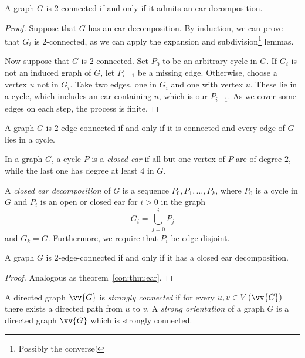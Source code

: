 \begin{izrek}
\label{con:thm:ear}
A graph $G$ is $2$-connected if and only if it admits an ear
decomposition.
\end{izrek}

\begin{proof}
Suppose that $G$ has an ear decomposition. By induction, we can
prove that $G_i$ is $2$-connected, as we can apply the expansion
and subdivision\footnote{Possibly the converse!} lemmas.

Now suppose that $G$ is $2$-connected. Set $P_0$ to be an arbitrary
cycle in $G$. If $G_i$ is not an induced graph of $G$, let
$P_{i+1}$ be a missing edge. Otherwise, choose a vertex $u$ not in
$G_i$. Take two edges, one in $G_i$ and one with vertex $u$. These
lie in a cycle, which includes an ear containing $u$, which is our
$P_{i+1}$. As we cover some edges on each step, the process is
finite.
\end{proof}

\begin{trditev}
A graph $G$ is $2$-edge-connected if and only if it is connected
and every edge of $G$ lies in a cycle.
\end{trditev}

\obvs

\begin{definicija}
In a graph $G$, a cycle $P$ is a \emph{closed ear} if
all but one vertex of $P$ are of degree $2$, while the last one has
degree at least $4$ in $G$.
\end{definicija}

\begin{definicija}
A \emph{closed ear decomposition} of $G$
is a sequence $P_0, P_1, \dots, P_k$, where $P_0$ is a cycle in $G$
and $P_i$ is an open or closed ear for $i > 0$ in the graph
\[
G_i = \bigcup_{j=0}^i P_j
\]
and $G_k = G$. Furthermore, we require that $P_i$ be edge-disjoint.
\end{definicija}

\begin{izrek}
A graph $G$ is $2$-edge-connected if and only if it has a closed
ear decomposition.
\end{izrek}

\begin{proof}
Analogous as theorem~\ref{con:thm:ear}.
\end{proof}


\begin{definicija}
A directed graph $\vv{G}$ is
\emph{strongly connected} if for every
$u, v \in V \br{\vv{G}}$ there exists a directed path from $u$ to
$v$. A \emph{strong orientation} of a
graph $G$ is a directed graph $\vv{G}$ which is strongly connected.
\end{definicija}

